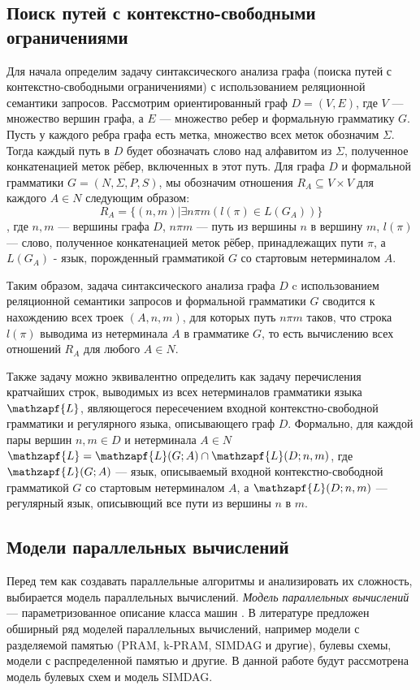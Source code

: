 \subsection{Поиск путей с контекстно-свободными ограничениями}
Для начала определим задачу синтаксического анализа графа (поиска путей с контекстно-свободными ограничениями) с
использованием реляционной семантики запросов.
Рассмотрим ориентированный граф $D = (V, E)$, где $V$ --- множество вершин графа, а $E$ --- множество ребер и
формальную грамматику $G$. Пусть у каждого ребра графа есть
метка, множество всех меток обозначим $\Sigma$. Тогда каждый путь в
$D$ будет обозначать слово над алфавитом из $\Sigma$, полученное
конкатенацией меток рёбер, включенных в этот путь.
Для графа $D$ и формальной грамматики $G = (N, \Sigma, P, S)$, мы
обозначим отношения $R_A \subseteq V\times V$ для каждого $A \in N$ следующим
образом:
\begin{equation}
R_A = \{(n, m) | \exists n\pi m(l(\pi) \in L(G_A)) \}
\end{equation},
где $n, m$ --- вершины графа $D$, $n\pi m$ --- путь из вершины $n$ в вершину $m$, $l(\pi)$ --- слово, полученное
конкатенацией меток рёбер, принадлежащих пути $\pi$, а $L(G_A)$ - язык, порожденный грамматикой $G$ со стартовым нетерминалом $A$.\par
Таким образом, задача синтаксического анализа графа $D$ c
использованием реляционной семантики запросов и формальной
грамматики $G$ сводится к нахождению всех троек $(A, n, m)$, для
которых путь $n\pi m$ таков, что строка $l(\pi)$ выводима из нетерминала
$A$ в грамматике $G$, то есть вычислению всех отношений $R_A$ для
любого $A \in N$.\par
Также задачу можно эквивалентно определить как задачу перечисления кратчайших строк, выводимых из всех нетерминалов грамматики языка $\mathzapf{L}$, являющегося пересечением входной контекстно-свободной грамматики и регулярного языка, описывающего граф $D$. Формально, для каждой пары вершин $n, m \in D$ и нетерминала $A \in N$ $\mathzapf{L} = \mathzapf{L}(G; A) \cap  \mathzapf{L}(D; n, m)$, где $\mathzapf{L}(G; A)$  --- язык, описываемый входной контекстно-свободной грамматикой $G$ со стартовым нетерминалом $A$, а $\mathzapf{L}(D; n, m)$ --- регулярный язык, описывющий все пути из вершины $n$ в $m$.

\subsection{Модели параллельных вычислений}
Перед тем как создавать параллельные алгоритмы и анализировать их сложность, выбирается модель параллельных вычислений. \textit{Модель параллельных вычислений} --- параметризованное описание класса машин \cite{PCompl}. В литературе предложен обширный ряд моделей параллельных вычислений, например модели с разделяемой памятью (PRAM, k-PRAM, SIMDAG и другие), булевы схемы, модели с распределенной памятью и другие. В данной работе будут рассмотрена модель булевых схем и модель SIMDAG.

